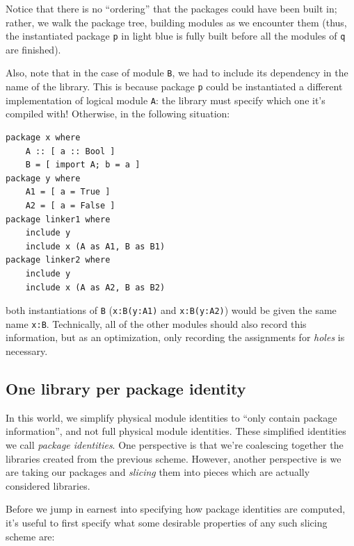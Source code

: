 \documentclass{article}
\begin{document}
Notice that there is no ``ordering'' that the packages could have been
built in; rather, we walk the package tree, building modules as we encounter
them (thus, the instantiated package \verb|p| in light blue is fully built before all
the modules of \verb|q| are finished).

Also, note that in the case of module \verb|B|, we had to include its
dependency in the name of the library.  This is because package \verb|p| could
be instantiated a different implementation of logical module \verb|A|: the
library must specify which one it's compiled with!  Otherwise, in the following situation:

\begin{verbatim}
package x where
    A :: [ a :: Bool ]
    B = [ import A; b = a ]
package y where
    A1 = [ a = True ]
    A2 = [ a = False ]
package linker1 where
    include y
    include x (A as A1, B as B1)
package linker2 where
    include y
    include x (A as A2, B as B2)
\end{verbatim}

both instantiations of \verb|B| (\verb|x:B(y:A1)| and \verb|x:B(y:A2)|)
would be given the same name \verb|x:B|.
Technically, all of the other
modules should also record this information, but as an optimization, only
recording the assignments for \emph{holes} is necessary.

\subsection{One library per package identity}

In this world, we simplify physical module identities to ``only contain
package information'', and not full physical module identities.  These
simplified identities we call \emph{package identities}. One perspective
is that we're coalescing together the libraries created from the
previous scheme.  However, another perspective is we are taking our
packages and \emph{slicing} them into pieces which are actually
considered libraries.

Before we jump in earnest into specifying how package identities are
computed, it's useful to first specify what some desirable properties
of any such slicing scheme are:
\end{document}
